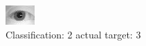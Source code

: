 \begin{figure}[h!]
\begin{center}
\includegraphics[width=0.60\columnwidth]{figures/ID1200_class_2_target_3.png}
\end{center}
\caption{ Classification: 2 actual target: 3}
\label{fig:ID1200_class_2_target_3}
\end{figure}
